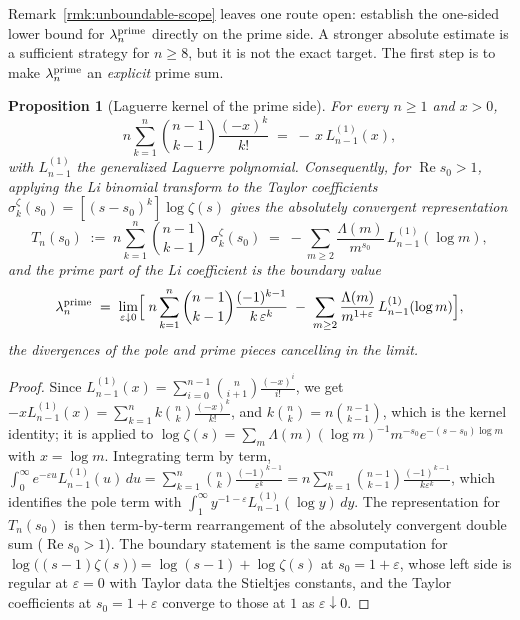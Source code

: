 \documentclass[11pt]{amsart}
\newtheorem{proposition}[theorem]{Proposition}
\theoremstyle{definition}
\theoremstyle{remark}
\theoremstyle{definition}
\renewcommand{\Re}{\operatorname{Re}}
\begin{document}
Remark~\ref{rmk:unboundable-scope} leaves one route open: establish the one-sided lower bound for
$\lambda_n^{\rm prime}$ directly on the prime side.  A stronger absolute estimate is a sufficient
strategy for $n\ge8$, but it is not the exact target.  The first step is to make
$\lambda_n^{\rm prime}$ an \emph{explicit} prime sum.

\begin{proposition}[Laguerre kernel of the prime side]\label{prop:prime-kernel}
For every $n\ge1$ and $x>0$,
\[
   n\sum_{k=1}^{n}\binom{n-1}{k-1}\frac{(-x)^k}{k!}\;=\;-\,x\,L^{(1)}_{n-1}(x),
\]
with $L^{(1)}_{n-1}$ the generalized Laguerre polynomial.  Consequently, for $\Re s_0>1$,
applying the Li binomial transform to the Taylor coefficients
$\sigma_k^{\zeta}(s_0)=[(s-s_0)^k]\log\zeta(s)$ gives the absolutely convergent representation
\[
   T_n(s_0)\;:=\;n\sum_{k=1}^{n}\binom{n-1}{k-1}\,\sigma_k^{\zeta}(s_0)
   \;=\;-\sum_{m\ge2}\frac{\Lambda(m)}{m^{s_0}}\,L^{(1)}_{n-1}(\log m),
\]
and the prime part of the Li coefficient is the boundary value
\[
   \lambda_n^{\rm prime}
   \;=\;\lim_{\varepsilon\downarrow0}\Bigl[\;
   n\sum_{k=1}^{n}\binom{n-1}{k-1}\frac{(-1)^{k-1}}{k\,\varepsilon^{k}}
   \;-\;\sum_{m\ge2}\frac{\Lambda(m)}{m^{1+\varepsilon}}\,L^{(1)}_{n-1}(\log m)\Bigr],
\]
the divergences of the pole and prime pieces cancelling in the limit.
\end{proposition}

\begin{proof}
Since $L^{(1)}_{n-1}(x)=\sum_{i=0}^{n-1}\binom{n}{i+1}\frac{(-x)^i}{i!}$, we get
$-xL^{(1)}_{n-1}(x)=\sum_{k=1}^{n}k\binom nk\frac{(-x)^k}{k!}$, and $k\binom nk=n\binom{n-1}{k-1}$,
which is the kernel identity; it is applied to $\log\zeta(s)=\sum_m\Lambda(m)(\log m)^{-1}m^{-s_0}e^{-(s-s_0)\log m}$
with $x=\log m$.  Integrating term by term,
$\int_0^\infty e^{-\varepsilon u}L^{(1)}_{n-1}(u)\,du=\sum_{k=1}^n\binom nk\frac{(-1)^{k-1}}{\varepsilon^k}=n\sum_{k=1}^n\binom{n-1}{k-1}\frac{(-1)^{k-1}}{k\varepsilon^k}$,
which identifies the pole term with $\int_1^\infty y^{-1-\varepsilon}L^{(1)}_{n-1}(\log y)\,dy$.  The representation for $T_n(s_0)$ is then term-by-term rearrangement of
the absolutely convergent double sum ($\Re s_0>1$).  The boundary statement is the same computation for
$\log\bigl((s-1)\zeta(s)\bigr)=\log(s-1)+\log\zeta(s)$ at $s_0=1+\varepsilon$, whose left side is
regular at $\varepsilon=0$ with Taylor data the Stieltjes constants, and the Taylor coefficients
at $s_0=1+\varepsilon$ converge to those at $1$ as $\varepsilon\downarrow0$.
\end{proof}
\end{document}
